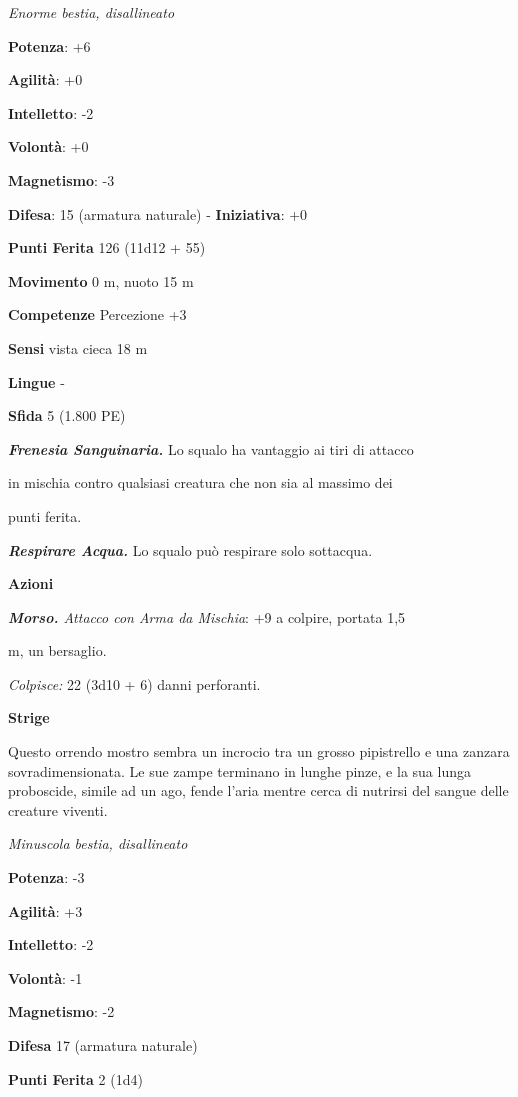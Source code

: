\begin{multicols}{2}
\emph{Enorme bestia, disallineato}

\textbf{Potenza}: +6

\textbf{Agilità}: +0

\textbf{Intelletto}: -2

\textbf{Volontà}: +0

\textbf{Magnetismo}: -3

\textbf{Difesa}: 15 (armatura naturale) - \textbf{Iniziativa}: +0

\textbf{Punti Ferita} 126 (11d12 + 55)

\textbf{Movimento} 0 m, nuoto 15 m

\textbf{Competenze} Percezione +3

\textbf{Sensi} vista cieca 18 m

\textbf{Lingue} -

\textbf{Sfida} 5 (1.800 PE)\smallskip

\emph{\textbf{Frenesia Sanguinaria.}} Lo squalo ha vantaggio ai tiri di
attacco

in mischia contro qualsiasi creatura che non sia al massimo dei

punti ferita.

\emph{\textbf{Respirare Acqua.}} Lo squalo può respirare solo sottacqua.

\smallskip\textbf{Azioni}

\emph{\textbf{Morso.} Attacco con Arma da Mischia}: +9 a colpire,
portata 1,5

m, un bersaglio.

\emph{Colpisce:} 22 (3d10 + 6) danni perforanti.



\textbf{Strige}

Questo orrendo mostro sembra un incrocio tra un grosso pipistrello e una
zanzara sovradimensionata. Le sue zampe terminano in lunghe pinze, e la
sua lunga proboscide, simile ad un ago, fende l'aria mentre cerca di
nutrirsi del sangue delle creature viventi.

\emph{Minuscola bestia, disallineato}

\textbf{Potenza}: -3

\textbf{Agilità}: +3

\textbf{Intelletto}: -2

\textbf{Volontà}: -1

\textbf{Magnetismo}: -2

\textbf{Difesa} 17 (armatura naturale)

\textbf{Punti Ferita} 2 (1d4)


\end{multicols}
